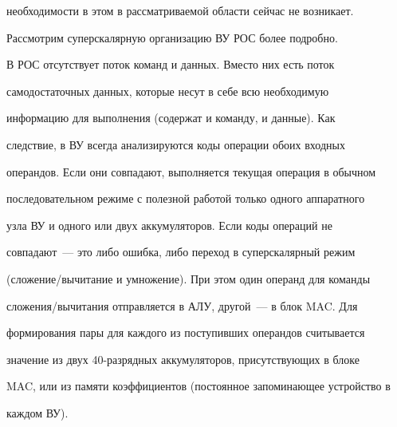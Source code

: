 необходимости в этом в рассматриваемой области сейчас не возникает. 


Рассмотрим суперскалярную организацию ВУ РОС более подробно.


      


      В РОС отсутствует поток команд и данных. Вместо них есть поток 


самодостаточных данных, которые несут в себе всю необходимую 


информацию для выполнения (содержат и команду, и данные). Как 


следствие, в ВУ всегда анализируются коды операции обоих входных 


операндов. Если они совпадают, выполняется текущая операция в обычном 


последовательном режиме с полезной работой только одного аппаратного 


узла ВУ и одного или двух аккумуляторов. Если коды операций не 


совпадают~--- это либо ошибка, либо переход в суперскалярный режим 


(сложение/вычитание и умножение). При этом один операнд для команды 


сложения/вычитания отправляется в АЛУ, другой~--- в блок MAC. Для 


формирования пары для каждого из поступивших операндов считывается 


значение из двух 40-раз\-ряд\-ных аккумуляторов, присутствующих в блоке 


MAC, или из памяти коэффициентов (постоянное запоминающее устройство в 


каждом ВУ).





